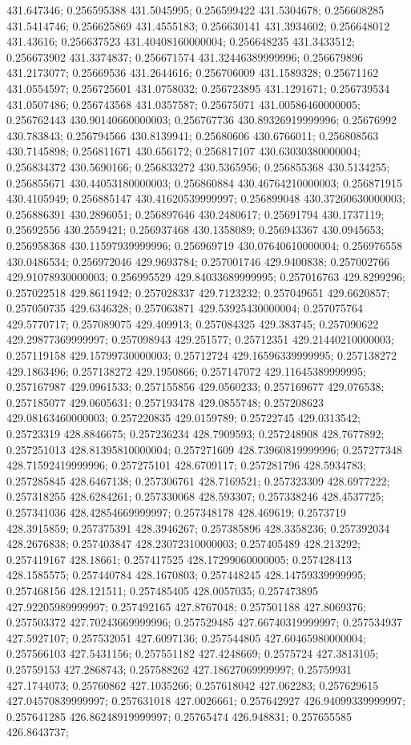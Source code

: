 431.647346; 0.256595388 431.5045995; 0.256599422 431.5304678; 0.256608285 431.5414746; 0.256625869 431.4555183; 0.256630141 431.3934602; 0.256648012 431.43616; 0.256637523 431.40408160000004; 0.256648235 431.3433512; 0.256673902 431.3374837; 0.256671574 431.32446389999996; 0.256679896 431.2173077; 0.25669536 431.2644616; 0.256706009 431.1589328; 0.25671162 431.0554597; 0.256725601 431.0758032; 0.256723895 431.1291671; 0.256739534 431.0507486; 0.256743568 431.0357587; 0.25675071 431.00586460000005; 0.256762443 430.90140660000003; 0.256767736 430.89326919999996; 0.25676992 430.783843; 0.256794566 430.8139941; 0.25680606 430.6766011; 0.256808563 430.7145898; 0.256811671 430.656172; 0.256817107 430.63030380000004; 0.256834372 430.5690166; 0.256833272 430.5365956; 0.256855368 430.5134255; 0.256855671 430.44053180000003; 0.256860884 430.46764210000003; 0.256871915 430.4105949; 0.256885147 430.41620539999997; 0.256899048 430.37260630000003; 0.256886391 430.2896051; 0.256897646 430.2480617; 0.25691794 430.1737119; 0.25692556 430.2559421; 0.256937468 430.1358089; 0.256943367 430.0945653; 0.256958368 430.11597939999996; 0.256969719 430.07640610000004; 0.256976558 430.0486534; 0.256972046 429.9693784; 0.257001746 429.9400838; 0.257002766 429.91078930000003; 0.256995529 429.84033689999995; 0.257016763 429.8299296; 0.257022518 429.8611942; 0.257028337 429.7123232; 0.257049651 429.6620857; 0.257050735 429.6346328; 0.257063871 429.53925430000004; 0.257075764 429.5770717; 0.257089075 429.409913; 0.257084325 429.383745; 0.257090622 429.29877369999997; 0.257098943 429.251577; 0.25712351 429.21440210000003; 0.257119158 429.15799730000003; 0.25712724 429.16596339999995; 0.257138272 429.1863496; 0.257138272 429.1950866; 0.257147072 429.11645389999995; 0.257167987 429.0961533; 0.257155856 429.0560233; 0.257169677 429.076538; 0.257185077 429.0605631; 0.257193478 429.0855748; 0.257208623 429.08163460000003; 0.257220835 429.0159789; 0.25722745 429.0313542; 0.25723319 428.8846675; 0.257236234 428.7909593; 0.257248908 428.7677892; 0.257251013 428.81395810000004; 0.257271609 428.73960819999996; 0.257277348 428.71592419999996; 0.257275101 428.6709117; 0.257281796 428.5934783; 0.257285845 428.6467138; 0.257306761 428.7169521; 0.257323309 428.6977222; 0.257318255 428.6284261; 0.257330068 428.593307; 0.257338246 428.4537725; 0.257341036 428.42854669999997; 0.257348178 428.469619; 0.2573719 428.3915859; 0.257375391 428.3946267; 0.257385896 428.3358236; 0.257392034 428.2676838; 0.257403847 428.23072310000003; 0.257405489 428.213292; 0.257419167 428.18661; 0.257417525 428.17299060000005; 0.257428413 428.1585575; 0.257440784 428.1670803; 0.257448245 428.14759339999995; 0.257468156 428.121511; 0.257485405 428.0057035; 0.257473895 427.92205989999997; 0.257492165 427.8767048; 0.257501188 427.8069376; 0.257503372 427.70243669999996; 0.257529485 427.66740319999997; 0.257534937 427.5927107; 0.257532051 427.6097136; 0.257544805 427.60465980000004; 0.257566103 427.5431156; 0.257551182 427.4248669; 0.2575724 427.3813105; 0.25759153 427.2868743; 0.257588262 427.18627069999997; 0.25759931 427.1744073; 0.25760862 427.1035266; 0.257618042 427.062283; 0.257629615 427.04570839999997; 0.257631018 427.0026661; 0.257642927 426.94099339999997; 0.257641285 426.86248919999997; 0.25765474 426.948831; 0.257655585 426.8643737; 